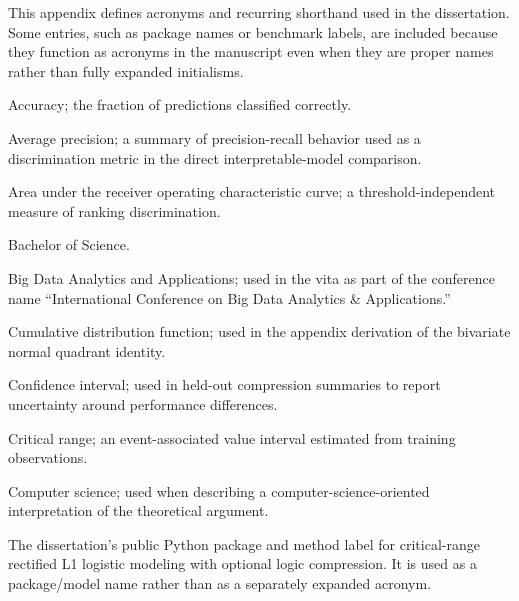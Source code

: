 
\clearpage

\label{app:acronym_definitions}

This appendix defines acronyms and recurring shorthand used in the dissertation. Some entries, such as package names or benchmark labels, are included because they function as acronyms in the manuscript even when they are proper names rather than fully expanded initialisms.

\begin{description}[style=nextline,leftmargin=0pt,labelsep=0pt]
    \item[ACC] Accuracy; the fraction of predictions classified correctly.

    \item[AP] Average precision; a summary of precision-recall behavior used as a discrimination metric in the direct interpretable-model comparison.

    \item[AUC] Area under the receiver operating characteristic curve; a threshold-independent measure of ranking discrimination.

    \item[B.S.] Bachelor of Science.

    \item[BDAA] Big Data Analytics and Applications; used in the vita as part of the conference name ``International Conference on Big Data Analytics \& Applications.''

    \item[CDF] Cumulative distribution function; used in the appendix derivation of the bivariate normal quadrant identity.

    \item[CI] Confidence interval; used in held-out compression summaries to report uncertainty around performance differences.

    \item[CR] Critical range; an event-associated value interval estimated from training observations.

    \item[CS] Computer science; used when describing a computer-science-oriented interpretation of the theoretical argument.

    \item[CUTLASS] The dissertation's public Python package and method label for critical-range rectified L1 logistic modeling with optional logic compression. It is used as a package/model name rather than as a separately expanded acronym.


\end{description}
